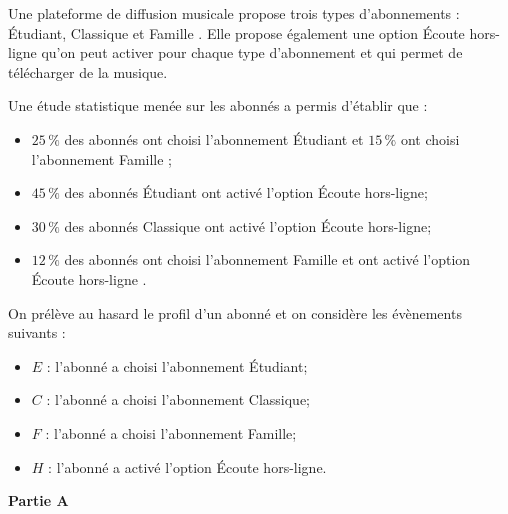 Une plateforme de diffusion musicale propose trois types d'abonnements : \og Étudiant\fg{}, \og Classique \fg{} et \og Famille \fg{}. Elle propose également une option \og Écoute hors-ligne \fg{} qu'on peut activer pour chaque type d'abonnement et qui permet de télécharger de la musique.

\smallskip

Une étude statistique menée sur les abonnés a permis d'établir que :
\begin{itemize}
\item $25\,\%$ des abonnés ont choisi l'abonnement \og Étudiant\fg{} et $15\,\%$ ont choisi l'abonnement \og  Famille \fg{};
\item $45\,\%$ des abonnés \og Étudiant\fg{} ont activé l'option \og Écoute hors-ligne\fg{};
\item $30\,\%$ des abonnés \og Classique\fg{} ont activé l'option \og Écoute hors-ligne\fg{};
\item $12\,\%$ des abonnés ont choisi l'abonnement \og Famille\fg{} et ont activé l'option \og Écoute hors-ligne \fg{}.
\end{itemize}

\smallskip

On prélève au hasard le profil d'un abonné et on considère les évènements suivants :

\begin{itemize}
\item $E$ : l'abonné a choisi l'abonnement \og Étudiant\fg{};
\item $C$ : l'abonné a choisi l'abonnement \og Classique\fg{};
\item $F$ : l'abonné a choisi l'abonnement \og Famille\fg{};
\item $H$ : l'abonné a activé l'option \og Écoute hors-ligne\fg{}.
\end{itemize}

\textbf{Partie A}

